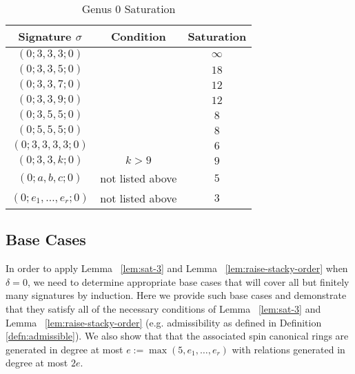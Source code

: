 \documentclass{amsart}
\theoremstyle{plain}
\theoremstyle{definition}
\theoremstyle{remark}
\numberwithin{equation}{section}
\newcommand\ssec{\subsection}
\begin{document}
\begin{table}
\begin{tabular}
	{| c | c || c |}
	\hline
	Signature $\sigma$ & Condition & Saturation \\
	\hline
	\hline

	$(0; 3, 3, 3; 0)$ & & $\infty$ \\	\hline

	$(0; 3, 3, 5; 0)$ & & $18$ \\	\hline
	
	$(0; 3, 3, 7; 0)$ & & $12$ \\	\hline
	
	$(0; 3, 3, 9; 0)$ & & $12$ \\	\hline
	
	$(0; 3, 5, 5; 0)$ & & $8$ \\	\hline
	
	$(0; 5, 5, 5; 0)$ & & $8$ \\	\hline
	
	$(0; 3, 3, 3, 3; 0)$ & & $6$ \\	\hline
	
	\hline
	\hline
	
	$(0; 3, 3, k; 0)$ & $k > 9$ & $9$ \\	\hline
	
	$(0; a, b, c; 0)$ & not listed above & $5$ \\	\hline
	
	$(0; e_1, \ldots, e_r; 0)$ & not listed above & $3$ \\	\hline
	\end{tabular}
	\caption{Genus 0 Saturation}
	\label{table:g-0-sat}
\end{table}

\ssec{Base Cases}
\label{ssec:g-0_base}
In order to apply Lemma ~\ref{lem:sat-3} and Lemma
~\ref{lem:raise-stacky-order} when $\delta = 0$,
we need to determine appropriate base cases that will
cover all but finitely many signatures by induction.
Here we provide such base cases and demonstrate that
they satisfy all of the necessary conditions of
Lemma ~\ref{lem:sat-3} and Lemma ~\ref{lem:raise-stacky-order}
(e.g. admissibility as defined in Definition \ref{defn:admissible}). We also show that that the associated spin
canonical rings are generated in degree at most $e := \max(5, e_1,
\ldots, e_r)$ with relations generated in degree at most $2e$.
\end{document}
